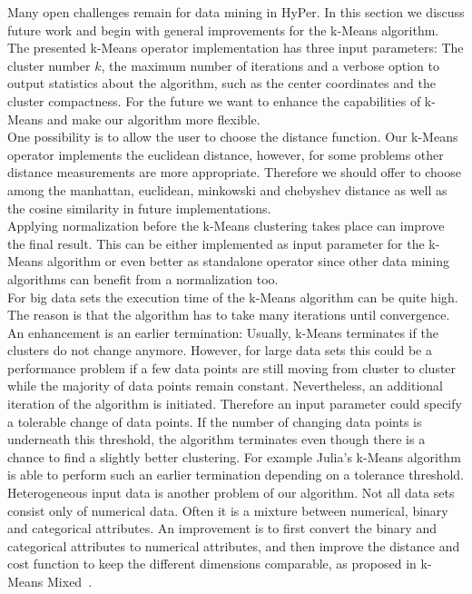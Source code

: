 Many open challenges remain for data mining in HyPer. In this section we discuss future work and begin with general improvements for the k-Means algorithm.
\\
The presented k-Means operator implementation has three input parameters: The cluster number $k$, the maximum number of iterations and a verbose option to output statistics about the algorithm, such as the center coordinates and the cluster compactness. For the future we want to enhance the capabilities of k-Means and make our algorithm more flexible. 
\\
One possibility is to allow the user to choose the distance function. Our k-Means operator implements the euclidean distance, however, for some problems other distance measurements are more appropriate. Therefore we should offer to choose among the manhattan, euclidean, minkowski and chebyshev distance as well as the cosine similarity in future implementations.
\\
Applying normalization before the k-Means clustering takes place can improve the final result. This can be either implemented as input parameter for the k-Means algorithm or even better as standalone operator since other data mining algorithms can benefit from a normalization too.
\\
For big data sets the execution time of the k-Means algorithm can be quite high. The reason is that the algorithm has to take many iterations until convergence. An enhancement is an earlier termination: Usually, k-Means terminates if the clusters do not change anymore. However, for large data sets this could be a performance problem if a few data points are still moving from cluster to cluster while the majority of data points remain constant. Nevertheless, an additional iteration of the algorithm is initiated. Therefore an input parameter could specify a tolerable change of data points. If the number of changing data points is underneath this threshold, the algorithm terminates even though there is a chance to find a slightly better clustering. For example Julia's k-Means algorithm is able to perform such an earlier termination depending on a tolerance threshold.
\\
Heterogeneous input data is another problem of our algorithm. Not all data sets consist only of numerical data. Often it is a mixture between numerical, binary and categorical attributes. An improvement is to first convert the binary and categorical attributes to numerical attributes, and then improve the distance and cost function to keep the different dimensions comparable, as proposed in k-Means Mixed~\parencite{ahmad2007kmean}.
